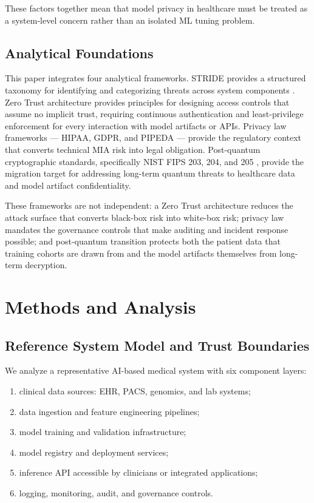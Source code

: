 \documentclass[conference]{IEEEtran}
\begin{document}
	These factors together mean that model privacy in healthcare must be treated as a system-level concern rather than an isolated ML tuning problem.

	\subsection{Analytical Foundations}
	This paper integrates four analytical frameworks. STRIDE provides a structured taxonomy for identifying and categorizing threats across system components \cite{nistzt}. Zero Trust architecture provides principles for designing access controls that assume no implicit trust, requiring continuous authentication and least-privilege enforcement for every interaction with model artifacts or APIs. Privacy law frameworks --- HIPAA, GDPR, and PIPEDA --- provide the regulatory context that converts technical MIA risk into legal obligation. Post-quantum cryptographic standards, specifically NIST FIPS 203, 204, and 205 \cite{fips203,fips204,fips205}, provide the migration target for addressing long-term quantum threats to healthcare data and model artifact confidentiality.

	These frameworks are not independent: a Zero Trust architecture reduces the attack surface that converts black-box risk into white-box risk; privacy law mandates the governance controls that make auditing and incident response possible; and post-quantum transition protects both the patient data that training cohorts are drawn from and the model artifacts themselves from long-term decryption.

	\section{Methods and Analysis}

	\subsection{Reference System Model and Trust Boundaries}
	We analyze a representative AI-based medical system with six component layers:
	\begin{enumerate}[leftmargin=1.2em]
		\item clinical data sources: EHR, PACS, genomics, and lab systems;
		\item data ingestion and feature engineering pipelines;
		\item model training and validation infrastructure;
		\item model registry and deployment services;
		\item inference API accessible by clinicians or integrated applications;
		\item logging, monitoring, audit, and governance controls.
	\end{enumerate}
\end{document}
